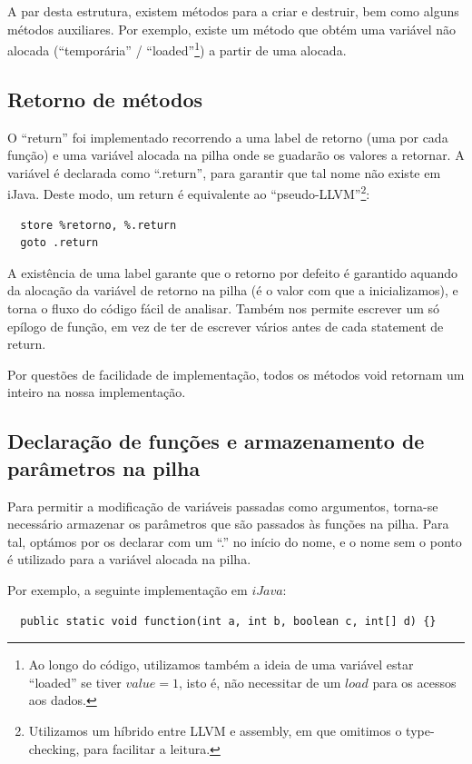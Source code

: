 \documentclass[11pt,a4paper]{article}
\begin{document}
A par desta estrutura, existem métodos para a criar e destruir, bem como alguns métodos auxiliares. Por exemplo, existe um método que obtém uma variável não alocada (``temporária'' / ``loaded''\footnote{Ao longo do código, utilizamos também a ideia de uma variável estar ``loaded'' se tiver $value = 1$, isto é, não necessitar de um $load$ para os acessos aos dados.}) a partir de uma alocada.

\subsection{Retorno de métodos}

O ``return'' foi implementado recorrendo a uma label de retorno (uma por cada função) e uma variável alocada na pilha onde se guadarão os valores a retornar. A variável é declarada como ``.return'', para garantir que tal nome não existe em iJava. Deste modo, um return é equivalente ao ``pseudo-LLVM''\footnote{Utilizamos um híbrido entre LLVM e assembly, em que omitimos o type-checking, para facilitar a leitura.}:

\begin{lstlisting}
  store %retorno, %.return
  goto .return
\end{lstlisting}

A existência de uma label garante que o retorno por defeito é garantido aquando da alocação da variável de retorno na pilha (é o valor com que a inicializamos), e torna o fluxo do código fácil de analisar. Também nos permite escrever um só epílogo de função, em vez de ter de escrever vários antes de cada statement de return.

Por questões de facilidade de implementação, todos os métodos void retornam um inteiro na nossa implementação.

\subsection{Declaração de funções e armazenamento de parâmetros na pilha}
Para permitir a modificação de variáveis passadas como argumentos, torna-se necessário armazenar os parâmetros que são passados às funções na pilha. Para tal, optámos por os declarar com um ``.'' no início do nome, e o nome sem o ponto é utilizado para a variável alocada na pilha.

Por exemplo, a seguinte implementação em $iJava$:
\begin{lstlisting}
  public static void function(int a, int b, boolean c, int[] d) {}
\end{lstlisting}
\end{document}
